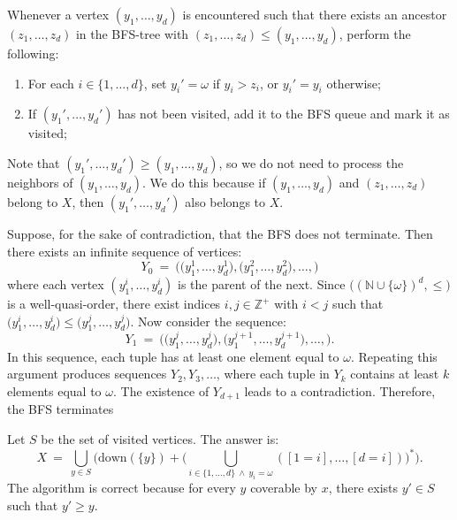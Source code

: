 \documentclass[12pt]{article}
\begin{document}
	\medskip
	
	Whenever a vertex \((y_{1}, \ldots, y_{d})\) is encountered such that there
	exists an ancestor \((z_{1}, \ldots, z_{d})\) in the BFS-tree with \((z_{1},
	\ldots, z_{d}) \leqslant (y_{1}, \ldots, y_{d})\), perform the following:
	\begin{enumerate}
		\item For each \(i \in \{1, \ldots, d\}\), set \(y_{i}' = \omega\) if
		\(y_{i} > z_{i}\), or \(y_{i}' = y_{i}\) otherwise;
		\item If \((y_{1}', \ldots, y_{d}')\) has not been visited, add it to
		      the BFS queue and mark it as visited;
	\end{enumerate}
	Note that \((y_{1}', \ldots, y_{d}') \geqslant (y_{1}, \ldots, y_{d})\), so
	we do not need to process the neighbors of \((y_{1}, \ldots, y_{d})\). We do
	this because if \((y_{1}, \ldots, y_{d})\) and \((z_{1}, \ldots, z_{d})\)
	belong to \(X\), then \((y_{1}', \ldots, y_{d}')\) also belongs to \(X\).
	
	\medskip
	
	Suppose, for the sake of contradiction, that the BFS does not terminate.
	Then there exists an infinite sequence of vertices:
	\[ Y_{0} \ = \ \big( \big( y_{1}^{1}, \ldots, y_{d}^{1} \big), \big(
	y_{1}^{2}, \ldots, y_{d}^{2} \big), \ldots, \big) \]
	where each vertex \((y_{1}^{i}, \ldots, y_{d}^{i})\) is the parent of the
	next. Since \(\big( (\mathbb{N} \cup \{\omega\})^{d}, \leqslant \big)\) is a
	well-quasi-order, there exist indices \(i, j \in \mathbb{Z}^{+}\) with \(i <
	j\) such that \(\big( y_{1}^{i}, \ldots, y_{d}^{i} \big) \leqslant \big(
	y_{1}^{j}, \ldots, y_{d}^{j} \big)\). Now consider the sequence:
	\[ Y_{1} \ = \ \big( \big( y_{1}^{j}, \ldots, y_{d}^{j} \big), \big(
	y_{1}^{j + 1}, \ldots, y_{d}^{j + 1} \big), \ldots, \big) \text{.} \]
	In this sequence, each tuple has at least one element equal to \(\omega\).
	Repeating this argument produces sequences \(Y_{2}, Y_{3}, \ldots\), where
	each tuple in \(Y_{k}\) contains at least \(k\) elements equal to
	\(\omega\). The existence of \(Y_{d + 1}\) leads to a contradiction.
	Therefore, the BFS terminates
	
	\medskip
	
	Let \(S\) be the set of visited vertices. The answer is:
	\[ X \ = \ \bigcup_{y \in S} \Bigg( \text{down}(\{y\}) + \Bigg( \bigcup_{i
	\in \{1, \ldots, d\} \ \wedge \ y_{i} = \omega} ([1 = i], \ldots, [d = i])
	\Bigg)^{\ast} \Bigg) \text{.} \]
	The algorithm is correct because for every \(y\) coverable by \(x\), there
	exists \(y' \in S\) such that \(y' \geqslant y\).
\end{document}
